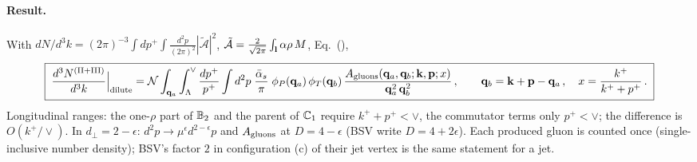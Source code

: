 \paragraph{Result.} With $dN/d^3k=(2\pi)^{-3}\int dp^+\!\int\frac{d^2p}{(2\pi)^2}|\tilde{\mathcal A}|^2$, $\tilde{\mathcal A}=\frac{2}{\sqrt{2\pi}}\int_{\mathbf{l}}\alpha\rho\,M$, Eq.~(),
\begin{align}
\boxed{\;\frac{d^3N^{\rm(II+III)}}{d^3k}\Big|_{\rm dilute}=\mathcal N\int_{\mathbf{q}_a}\int_{\Lambda}^{\vee}\frac{dp^+}{p^+}\int d^2p\;\frac{\bar\alpha_s}{\pi}\;\phi_P(\mathbf{q}_a)\,\phi_T(\mathbf{q}_b)\,\frac{A_{\rm gluons}(\mathbf{q}_a,\mathbf{q}_b;\mathbf{k},\mathbf{p};x)}{\mathbf{q}_a^2\,\mathbf{q}_b^2}\,,\qquad\mathbf{q}_b=\mathbf{k}+\mathbf{p}-\mathbf{q}_a\,,\quad x=\frac{k^+}{k^++p^+}\,.\;}\label{d:real}
\end{align}
Longitudinal ranges: the one-$\rho$ part of $\mathbb{B}_2$ and the parent of $\mathbb{C}_1$ require $k^++p^+<\vee$, the commutator terms only $p^+<\vee$; the difference is $O(k^+/\vee)$. In $d_\perp=2-\epsilon$: $d^2p\to\mu^\epsilon d^{2-\epsilon}p$ and $A_{\rm gluons}$ at $D=4-\epsilon$ (BSV write $D=4+2\epsilon$). Each produced gluon is counted once (single-inclusive number density); BSV's factor $2$ in configuration (c) of their jet vertex is the same statement for a jet.

